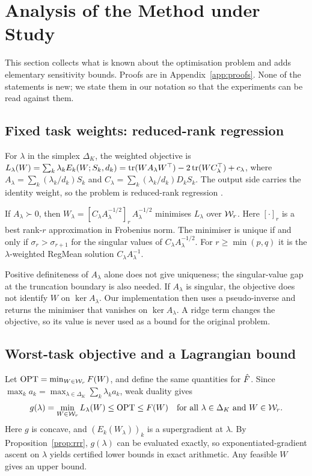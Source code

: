 \section{Analysis of the Method under Study}
\label{sec:analysis}

This section collects what is known about the optimisation problem and adds elementary
sensitivity bounds. Proofs are in Appendix~\ref{app:proofs}. None of the statements is new; we
state them in our notation so that the experiments can be read against them.

\subsection{Fixed task weights: reduced-rank regression}
For $\lambda$ in the simplex $\Delta_K$, the weighted objective is
$L_\lambda(W)=\sum_k\lambda_kE_k(W;S_k,d_k)=\operatorname{tr}(WA_\lambda W^\top)-2\operatorname{tr}(WC_\lambda^\top)+c_\lambda$,
where $A_\lambda=\sum_k(\lambda_k/d_k)S_k$ and $C_\lambda=\sum_k(\lambda_k/d_k)D_kS_k$. The output
side carries the identity weight, so the problem is reduced-rank regression
\citep{izenman1975reduced}.

\begin{proposition}[known]
\label{prop:rrr}
If $A_\lambda\succ0$, then $W_\lambda=[C_\lambda A_\lambda^{-1/2}]_r\,A_\lambda^{-1/2}$ minimises
$L_\lambda$ over $\mathcal{W}_r$. Here $[\cdot]_r$ is a best rank-$r$ approximation in Frobenius norm. The
minimiser is unique if and only if $\sigma_r>\sigma_{r+1}$ for the singular values of
$C_\lambda A_\lambda^{-1/2}$. For $r\ge\min(p,q)$ it is the $\lambda$-weighted RegMean solution
$C_\lambda A_\lambda^{-1}$.
\end{proposition}

Positive definiteness of $A_\lambda$ alone does not give uniqueness; the singular-value gap at the
truncation boundary is also needed. If $A_\lambda$ is singular, the objective does not identify
$W$ on $\ker A_\lambda$. Our implementation then uses a pseudo-inverse and returns the minimiser
that vanishes on $\ker A_\lambda$. A ridge term changes the objective, so its value is never used
as a bound for the original problem.

\subsection{Worst-task objective and a Lagrangian bound}
Let $\mathrm{OPT}=\min_{W\in\mathcal{W}_r}F(W)$, and define the same quantities for $\hat{F}$. Since
$\max_ka_k=\max_{\lambda\in\Delta_K}\sum_k\lambda_ka_k$, weak duality gives
\begin{equation}
g(\lambda)=\min_{W\in\mathcal{W}_r}L_\lambda(W)\le\mathrm{OPT}\le F(W)\quad\text{for all }
\lambda\in\Delta_K\text{ and }W\in\mathcal{W}_r.
\label{eq:weakduality}
\end{equation}
Here $g$ is concave, and $(E_k(W_\lambda))_k$ is a supergradient at $\lambda$. By
Proposition~\ref{prop:rrr}, $g(\lambda)$ can be evaluated exactly, so exponentiated-gradient
ascent on $\lambda$ yields certified lower bounds in exact arithmetic. Any feasible $W$ gives an
upper bound.

